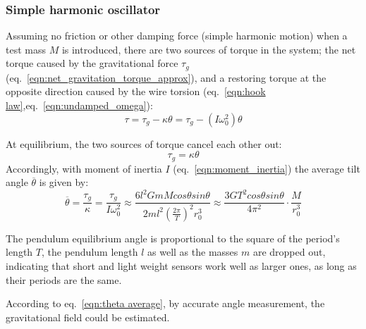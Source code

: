 \documentclass[\main/master.tex]{subfiles}
\begin{document}
\subsubsection{Simple harmonic oscillator}
Assuming no friction or other damping force (simple harmonic motion) when a test mass $M$ is introduced, there are two sources of torque in the system; the net torque caused by the gravitational force $\tau_g$ (eq.~\ref{eqn:net_gravitation_torque_approx}), and a restoring torque at the opposite direction caused by the wire torsion (eq.~\ref{eqn:hook law},eq.~\ref{eqn:undamped_omega}):
\begin{equation}
\tau = \tau_g - \kappa\theta = \tau_g - (I\omega_0^2)\theta    \label{eqn:gravitation_torque}
\end{equation}
\par\noindent
At equilibrium, the two sources of torque cancel each other out:
\begin{equation}
\tau_g =  \kappa\theta    \label{eqn:gravitation_torque_equilibrium}
\end{equation}
Accordingly, with moment of inertia $I$ (eq.~\ref{eqn:moment_inertia}) the average tilt angle  $\overline{\theta}$ is given by:
\begin{equation}
\overline{\theta} = \frac{\tau_g}{\kappa} =\frac{\tau_g}{I\omega_0^2}  \approx \frac{6l^2GmMcos\theta sin\theta}{2ml^2 (\frac{2\pi}{T})^2 r_0^3} \approx \frac{3GT^2cos\theta sin\theta}{4\pi^2 } \cdot \frac{M}{r_0^3}  \label{eqn:theta average}
\end{equation} 

\par\noindent
The pendulum equilibrium angle is proportional to the square of the period's length $T$, the pendulum length $l$ as well as the masses $m$ are dropped out, indicating that short and light weight sensors work well as larger ones, as long as their periods are the same.
\par\noindent
According to eq.~\ref{eqn:theta average}, by accurate angle measurement, the gravitational field could be estimated.
 
\end{document}

